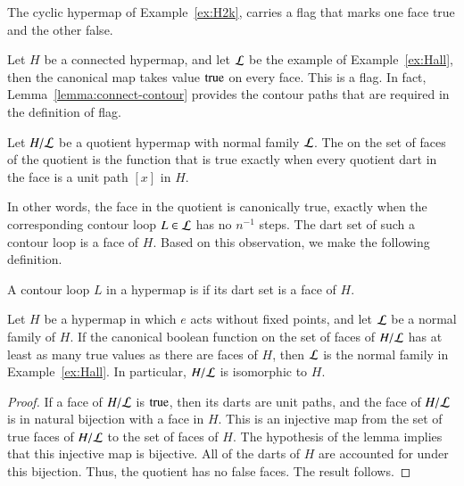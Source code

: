 \begin{example} 
The cyclic hypermap of Example~\ref{ex:H2k}, carries a
flag that marks one face true and the other false.
\end{example}

\begin{example}\label{ex:Hall-flag} 
Let $H$ be a connected hypermap, and let $\cal L$ be the example of
Example~\ref{ex:Hall}, then the canonical map takes value
${\operatorname{true}}$ on every face.  This is a flag. In fact,
Lemma~\ref{lemma:connect-contour} provides the contour paths that
are required in the definition of flag.
\end{example}

\begin{definition} Let $H/{\cal L}$ be a
quotient hypermap with normal family $\cal L$.  The
 on the set of faces of the
quotient is the function that is true exactly when every quotient dart in the
face is a unit path $[x]$ in $H$.  
%
\end{definition}

In other words, the face in the quotient is canonically true, exactly when the corresponding
contour loop $L\in {\cal L}$ has no $n^{-1}$ steps.  The dart set of such
a contour loop is a face of $H$.  Based on this observation, we make the following definition.

\begin{definition}
A contour loop $L$ in a hypermap is  if its dart set is a face of $H$.
\end{definition}


\begin{lemma}  
  Let $H$ be a hypermap in which $e$ acts without fixed points, and
  let ${\cal L}$ be a normal family of $H$. If the canonical boolean
  function on the set of faces of $H/{\cal L}$ has at least as many
  true values as there are faces of $H$, then $\cal L$ is the normal
  family in Example~\ref{ex:Hall}. In particular, $H/{\cal L}$ is
  isomorphic to $H$.
\end{lemma}

\begin{proof} If a face of  $H/{\cal L}$ is ${\operatorname{true}}$,  then
its darts are unit paths, and the face of $H/{\cal L}$ is in natural
bijection with a face in $H$.  This is an injective map from the
set of true faces of $H/{\cal L}$ to the set of faces of $H$.  The
hypothesis of the lemma implies that this injective map is
bijective. All of the darts of $H$ are accounted for under this
bijection. Thus, the quotient has no false faces.  The result
follows.
\end{proof}

